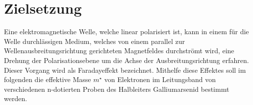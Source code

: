\section{Zielsetzung}
\label{sec:ziel}
Eine elektromagnetische Welle, welche linear polarisiert ist, kann in einem für die Welle durchlässigen Medium,
welches von einem parallel zur Wellenausbreitungsrichtung gerichteten Magnetfeldes durchströmt wird, eine Drehung
der Polarisationsebene um die Achse der Ausbreitungsrichtung erfahren. Dieser Vorgang wird als Faradayeffekt 
bezeichnet. Mithelfe diese Effektes soll im folgenden die effektive Masse $m^\star$ von Elektronen im Leitungsband
von verschiedenen n-dotierten Proben des Halbleiters Galliumarsenid bestimmt werden.
